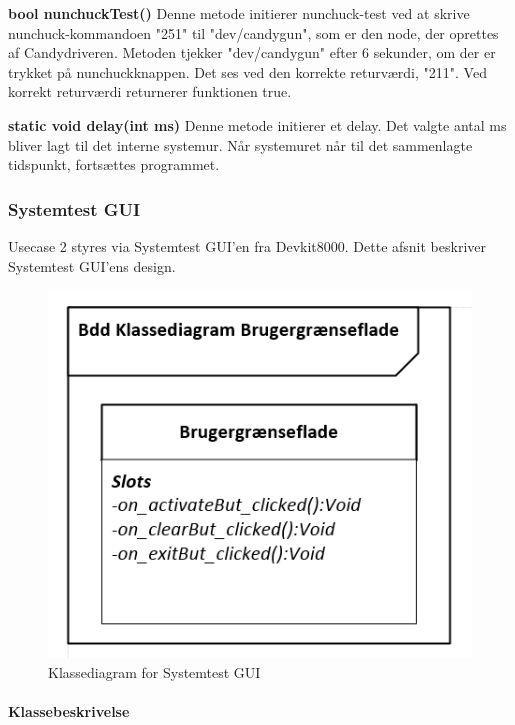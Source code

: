 \textbf{bool nunchuckTest()}	
Denne metode initierer nunchuck-test ved at skrive nunchuck-kommandoen "251" til "dev/candygun", som er den node, der oprettes af Candydriveren. Metoden tjekker "dev/candygun" efter 6 sekunder, om der er trykket på nunchuckknappen. Det ses ved den korrekte returværdi, "211". Ved korrekt returværdi returnerer funktionen true.

\textbf{static void delay(int ms)}
Denne metode initierer et delay. Det valgte antal ms bliver lagt til det interne systemur. Når systemuret når til det sammenlagte tidspunkt, fortsættes programmet.

\subsubsection{Systemtest GUI}
Usecase 2 styres via Systemtest GUI'en fra Devkit8000.
Dette afsnit beskriver Systemtest GUI'ens design.

\begin{figure}[H]
	\centering
	\includegraphics[width=\textwidth]{DesignOgImplementering/images/KlassediagramGUI}
	\caption{Klassediagram for Systemtest GUI}
	\label{fig:KlassediagramGUI}
\end{figure}

\paragraph{Klassebeskrivelse}\mbox{} \\
\label{sec:stmDescrip}

